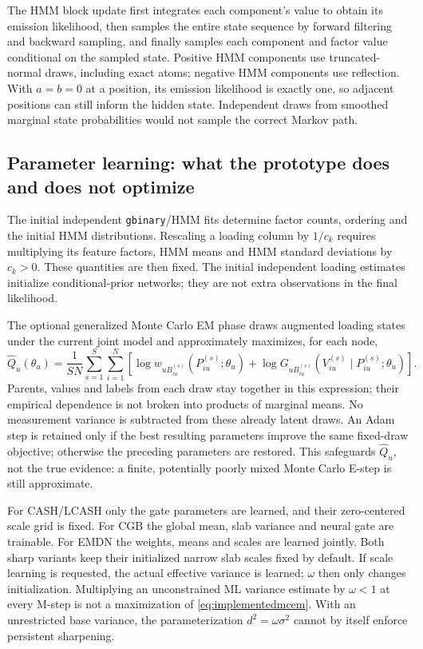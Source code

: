 The HMM block update first integrates each component's value to obtain
its emission likelihood, then samples the entire state sequence by
forward filtering and backward sampling, and finally samples each
component and factor value conditional on the sampled state. Positive
HMM components use truncated-normal draws, including exact atoms;
negative HMM components use reflection. With \(a=b=0\) at a position,
its emission likelihood is exactly one, so adjacent positions can still
inform the hidden state. Independent draws from smoothed marginal state
probabilities would not sample the correct Markov path.

\subsection{Parameter learning: what the prototype does and does not optimize}
The initial independent \texttt{gbinary}/HMM fits determine factor counts,
ordering and the initial HMM distributions. Rescaling a loading column by
\(1/c_k\) requires multiplying its feature factors, HMM means and HMM
standard deviations by \(c_k>0\). These quantities are then fixed.
The initial independent loading estimates initialize conditional-prior
networks; they are not extra observations in the final likelihood.

The optional generalized Monte Carlo EM phase draws augmented loading
states under the current joint model and approximately maximizes, for
each node,
\begin{equation}
\widehat Q_u(\theta_u)=\frac1{SN}\sum_{s=1}^S\sum_{i=1}^N
\left[
\log w_{uB_{iu}^{(s)}}(P_{iu}^{(s)};\theta_u)
+\log G_{uB_{iu}^{(s)}}(V_{iu}^{(s)}\mid P_{iu}^{(s)};\theta_u)
\right].
\label{eq:implementedmcem}
\end{equation}
Parents, values and labels from each draw stay together in this expression;
their empirical dependence is not broken into products of marginal means.
No measurement variance is subtracted from these already latent draws.
An Adam step is retained only if the best resulting parameters improve the
same fixed-draw objective; otherwise the preceding parameters are restored.
This safeguards \(\widehat Q_u\), not the true evidence: a finite,
potentially poorly mixed Monte Carlo E-step is still approximate.

For CASH/LCASH only the gate parameters are learned, and their zero-centered
scale grid is fixed. For CGB the global mean, slab variance and neural gate
are trainable. For EMDN the weights, means and scales are learned jointly.
Both sharp variants keep their initialized narrow slab scales fixed by
default. If scale learning is requested, the actual effective variance is
learned; \(\omega\) then only changes initialization. Multiplying an
unconstrained ML variance estimate by \(\omega<1\) at every M-step is not a
maximization of \eqref{eq:implementedmcem}. With an unrestricted base
variance, the parameterization \(d^2=\omega\sigma^2\) cannot by itself
enforce persistent sharpening.

